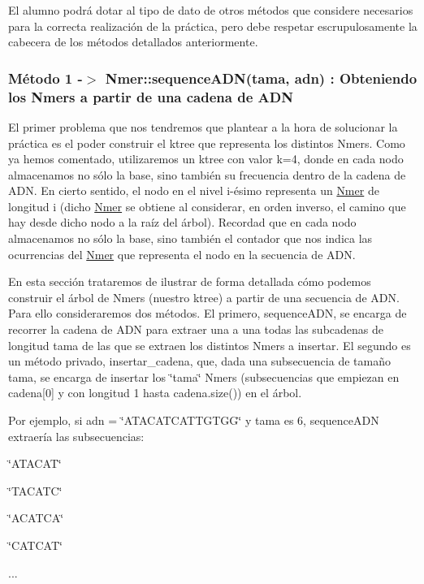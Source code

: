 El alumno podrá dotar al tipo de dato de otros métodos que considere necesarios para la correcta realización de la práctica, pero debe respetar escrupulosamente la cabecera de los métodos detallados anteriormente.\hypertarget{index_crear}{}\subsubsection{Método 1 -\/$>$  Nmer\+::sequence\+A\+D\+N(tama, adn) \+: Obteniendo los Nmers a partir de una cadena de A\+DN}\label{index_crear}
El primer problema que nos tendremos que plantear a la hora de solucionar la práctica es el poder construir el ktree que representa los distintos Nmers. Como ya hemos comentado, utilizaremos un ktree con valor k=4, donde en cada nodo almacenamos no sólo la base, sino también su frecuencia dentro de la cadena de A\+DN. En cierto sentido, el nodo en el nivel i-\/ésimo representa un \hyperlink{classNmer}{Nmer} de longitud i (dicho \hyperlink{classNmer}{Nmer} se obtiene al considerar, en orden inverso, el camino que hay desde dicho nodo a la raíz del árbol). Recordad que en cada nodo almacenamos no sólo la base, sino también el contador que nos indica las ocurrencias del \hyperlink{classNmer}{Nmer} que representa el nodo en la secuencia de A\+DN.

En esta sección trataremos de ilustrar de forma detallada cómo podemos construir el árbol de Nmers (nuestro ktree) a partir de una secuencia de A\+DN. Para ello consideraremos dos métodos. El primero, sequence\+A\+DN, se encarga de recorrer la cadena de A\+DN para extraer una a una todas las subcadenas de longitud tama de las que se extraen los distintos Nmers a insertar. El segundo es un método privado, insertar\+\_\+cadena, que, dada una subsecuencia de tamaño tama, se encarga de insertar los \char`\"{}tama\char`\"{} Nmers (subsecuencias que empiezan en cadena\mbox{[}0\mbox{]} y con longitud 1 hasta cadena.\+size()) en el árbol.

Por ejemplo, si adn = \char`\"{}\+A\+T\+A\+C\+A\+T\+C\+A\+T\+T\+G\+T\+G\+G\char`\"{} y tama es 6, sequence\+A\+DN extraería las subsecuencias\+:


\begin{DoxyItemize}
\item \char`\"{}\+A\+T\+A\+C\+A\+T\char`\"{}
\item \char`\"{}\+T\+A\+C\+A\+T\+C\char`\"{}
\item \char`\"{}\+A\+C\+A\+T\+C\+A\char`\"{}
\item \char`\"{}\+C\+A\+T\+C\+A\+T\char`\"{}
\item ...
\end{DoxyItemize}

